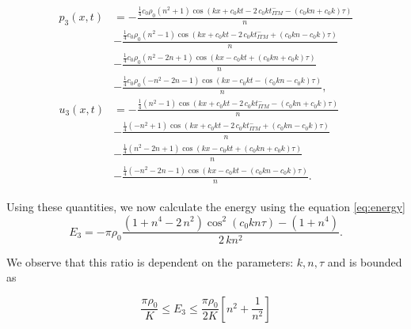 \begin{align}
    \begin{split}
        p_3\left(x, t\right) & = -\frac{{\frac{1}{4}c_{0}\rho_{0}\left( n^{2} + 1\right)} \cos\left(k x + c_{0} k t - 2 \, c_{0} k \mathit{t_{ITM}^-} - {\left(c_{0} k n + c_{0} k\right)} \tau\right)}{n} \\
        & - \frac{{\frac{1}{4}c_0\rho_0\left(n^{2} - 1\right)} \cos\left(k x + c_{0} k t - 2 \, c_{0} k \mathit{t_{ITM}^-} + {\left(c_{0} k n - c_{0} k\right)} \tau\right)}{n} \\
        & - \frac{{\frac{1}{4}c_0\rho_0\left(n^{2} - 2n + 1\right)} \cos\left(kx -c_{0} k t + {\left(c_{0} k n + c_{0} k\right)} \tau\right)}{n} \\
        & - \frac{{\frac{1}{4}c_0\rho_0\left(-n^{2} - 2n - 1\right)} \cos\left(kx-c_{0} k t - {\left(c_{0} k n - c_{0} k\right)} \tau\right)}{n}, \\
        u_3\left(x, t\right) & =  -\frac{{\frac{1}{4}\left(n^{2} - 1\right)} \cos\left( k x + c_{0} k t - 2 \, c_{0} k \mathit{t_{ITM}^-} - {\left(c_{0} k n + c_{0} k\right)} \tau\right)}{n} \\
        & - \frac{{\frac{1}{4}\left(-n^{2} + 1\right)} \cos\left(kx + c_{0} k t - 2 \, c_{0} k \mathit{t_{ITM}^-} + {\left(c_{0} k n - c_{0} k\right)} \tau\right)}{n} \\
        & - \frac{{\frac{1}{4}\left(n^{2} - 2n + 1\right)} \cos\left(kx -c_{0} k t + {\left(c_{0} k n + c_{0} k\right)} \tau\right)}{n} \\
        & - \frac{{\frac{1}{4}\left(-n^{2} - 2n - 1\right)} \cos\left(kx -c_{0} k t - {\left(c_{0} k n - c_{0} k\right)} \tau\right)}{n} .
    \end{split}
\end{align}

Using these quantities, we now calculate the energy using the equation \ref{eq:energy}
\begin{equation}
    E_3 = -\pi \rho_0\frac{{\left(1 + n^{4} - 2 \, n^{2}\right)} \cos^{2}\left(c_{0} k n \tau\right) - {\left(1 + n^{4}\right)}}{2 \, k n^{2}}.
\end{equation}

We observe that this ratio is dependent on the parameters: $k, n, \tau$ and is bounded as

\begin{equation}
    \frac{\pi \rho_0}{K} \leq E_3 \leq \frac{\pi \rho_0}{2K}\left[n^2 + \frac{1}{n^2}\right]
\end{equation}

